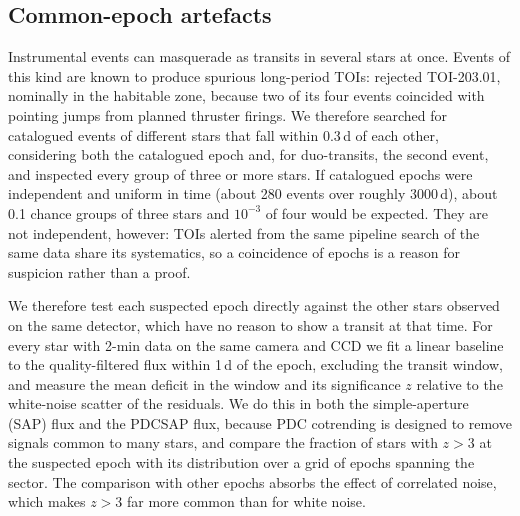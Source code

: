 \documentclass[fleqn,usenatbib]{mnras}
\begin{document}
\subsection{Common-epoch artefacts}
\label{sec:artefacts}

Instrumental events can masquerade as transits in several stars at once. Events of this kind are known to produce spurious long-period TOIs: \citet{Kaltenegger2021} rejected TOI-203.01, nominally in the habitable zone, because two of its four events coincided with pointing jumps from planned thruster firings. We therefore searched for catalogued events of different stars that fall within 0.3\,d of each other, considering both the catalogued epoch and, for duo-transits, the second event, and inspected every group of three or more stars. If catalogued epochs were independent and uniform in time (about 280 events over roughly 3000\,d), about 0.1 chance groups of three stars and $10^{-3}$ of four would be expected. They are not independent, however: TOIs alerted from the same pipeline search of the same data share its systematics, so a coincidence of epochs is a reason for suspicion rather than a proof.

We therefore test each suspected epoch directly against the other stars observed on the same detector, which have no reason to show a transit at that time. For every star with 2-min data on the same camera and CCD we fit a linear baseline to the quality-filtered flux within 1\,d of the epoch, excluding the transit window, and measure the mean deficit in the window and its significance $z$ relative to the white-noise scatter of the residuals. We do this in both the simple-aperture (SAP) flux and the PDCSAP flux, because PDC cotrending is designed to remove signals common to many stars, and compare the fraction of stars with $z > 3$ at the suspected epoch with its distribution over a grid of epochs spanning the sector. The comparison with other epochs absorbs the effect of correlated noise, which makes $z > 3$ far more common than for white noise.
\end{document}
